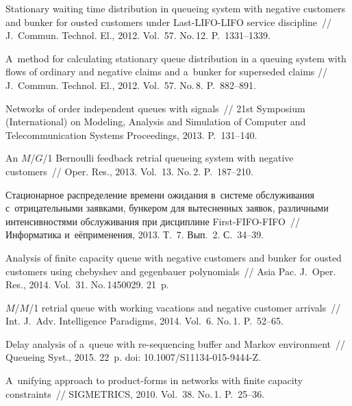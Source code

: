 \begin{multicols}{2}
{{\begin{thebibliography}{99}
 Stationary waiting time
distribution in queueing system with negative customers and bunker
for ousted customers under Last-LIFO-LIFO service discipline~//
{J.~Commun. Technol. El.}, 2012. Vol.~57. No.\,12. P.~1331--1339.

 A~method for calculating stationary
queue distribution in a queuing system with flows of ordinary and negative
claims and a~bunker for superseded claims // {J.~Commun. Technol.
El.}, 2012. Vol.~57. No.\,8. P.~882--891.

Networks of order independent queues with signals~// 
21st  Symposium (International) on Modeling, Analysis and Simulation of Computer 
and Telecommunication Systems Proceedings, 2013. P.~131--140.

An $M$/$G$/1 Bernoulli feedback retrial queueing system with negative customers~// 
{Oper. Res.}, 2013. Vol.~13. No.\,2. P.~187--210.

Стационарное распределение времени ожидания в~системе обслуживания 
с~отрицательными заявками, бункером для вытесненных заявок, различными интенсивностями 
обслуживания при дисциплине First-FIFO-FIFO~// Информатика и~её\linebreak применения, 2013. 
Т.~7. Вып.~2. С.~34--39. 

Analysis of finite capacity queue with negative customers and bunker for ousted customers using chebyshev and gegenbauer polynomials~//
{Asia Pac. J.~Oper. Res.}, 2014. Vol.~31. No.\,1450029. 21~p.



$M$/$M$/1 retrial queue with working vacations and negative customer arrivals~// 
{Int. J.~Adv. Intelligence Paradigms}, 2014. Vol.~6. No.\,1. P.~52--65.

Delay analysis of a~queue with re-sequencing buffer and Markov environment~// 
{Queueing Syst.}, 2015. 22~p. doi: 10.1007/S11134-015-9444-Z.


A~unifying approach to product-forms in networks with finite capacity constraints~// 
{SIGMETRICS}, 2010. Vol.~38. No.\,1. P.~25--36.


\end{thebibliography}}}
\end{multicols}
